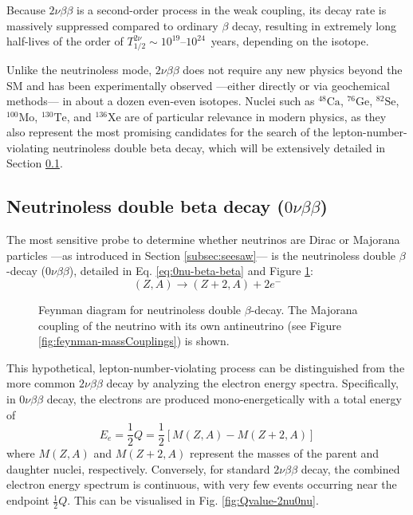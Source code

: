 Because $2\nu\beta\beta$ is a second-order process in the weak coupling, its decay rate is massively suppressed compared to ordinary $\beta$ decay, resulting in extremely long half-lives of the order of $T_{1/2}^{2\nu} \sim 10^{19}$--$10^{24}$~years, depending on the isotope.

Unlike the neutrinoless mode, $2\nu\beta\beta$ does not require any new physics beyond the \ac{SM} and has been experimentally observed —either directly or via geochemical methods— in about a dozen even-even isotopes. Nuclei such as ${}^{48}\text{Ca}$, ${}^{76}\text{Ge}$, ${}^{82}\text{Se}$, ${}^{100}\text{Mo}$, ${}^{130}\text{Te}$, and ${}^{136}\text{Xe}$ are of particular relevance in modern physics, as they also represent the most promising candidates for the search of the lepton-number-violating neutrinoless double beta decay, which will be extensively detailed in Section \ref{subsec:0nubetabeta}.

\subsection{Neutrinoless double beta decay (\texorpdfstring{$0\nu\beta\beta$}{0vbb})}
\label{subsec:0nubetabeta}

The most sensitive probe to determine whether neutrinos are Dirac or Majorana particles —as introduced in Section \ref{subsec:seesaw}— is the neutrinoless double $\beta$-decay ($0\nu\beta\beta$), detailed in Eq. \ref{eq:0nu-beta-beta} and Figure \ref{fig:0nubetabeta-diagram}:
\begin{equation}
    \label{eq:0nu-beta-beta}
    (Z, A) \longrightarrow (Z+2, A) + 2e^-
\end{equation} 

\begin{figure}[H]
    \centering
    
    \caption{Feynman diagram for neutrinoless double $\beta$-decay. The Majorana coupling of the neutrino with its own antineutrino (see Figure \ref{fig:feynman-massCouplings}) is shown.}
    \label{fig:0nubetabeta-diagram}
\end{figure}

This hypothetical, lepton-number-violating process can be distinguished from the more common $2\nu\beta\beta$ decay by analyzing the electron energy spectra. Specifically, in $0\nu\beta\beta$ decay, the electrons are produced mono-energetically with a total energy of
\begin{equation*}
    E_e = \frac{1}{2} Q = \frac{1}{2} [M(Z, A) - M(Z+2, A)] 
\end{equation*}
where $M(Z, A)$ and $M(Z+2, A)$ represent the masses of the parent and daughter nuclei, respectively. Conversely, for standard $2\nu\beta\beta$ decay, the combined electron energy spectrum is continuous, with very few events occurring near the endpoint $\frac{1}{2}Q$. This can be visualised in Fig. \ref{fig:Qvalue-2nu0nu}.

